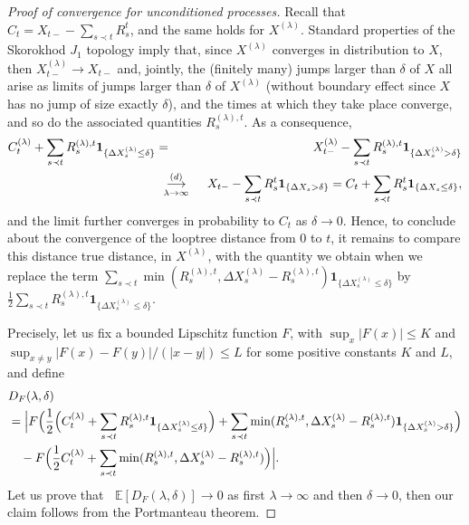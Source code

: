 \documentclass[british, a4paper,11pt]{article}
\numberwithin{equation}{section}
\theoremstyle{definition}
\newcommand{\E}{\mathop{}\!\mathbb{E}}
\newcommand{\ind}[1]{\mathbf{1}_{\{#1\}}}
\newcommand{\cvloi}[1][n]{\enskip\mathop{\longrightarrow}^{(d)}_{#1 \to \infty}\enskip}
\begin{document}
\begin{proof}[Proof of convergence for unconditioned processes]
Recall that $C_t = X_{t-} - \sum_{s \prec t} R^t_s$, and the same holds for $X^{(\lambda)}$.
Standard properties of the Skorokhod $J_{1}$ topology imply that, since $X^{(\lambda)}$ converges in distribution to $X$, then $X^{(\lambda)}_{t-} \to X_{t-}$ and, jointly, the (finitely many) jumps larger than $\delta$ of $X$ all arise as limits of jumps larger than $\delta$ of $X^{(\lambda)}$ (without boundary effect since $X$ has no jump of size exactly $\delta$), and the times at which they take place converge, and so do the associated quantities $R^{(\lambda), t}_s$.
As a consequence,
\begin{eqnarray*}
C^{(\lambda)}_t + \sum_{s \prec t} R^{(\lambda), t}_s \ind{\Delta X^{(\lambda)}_s\leq \delta}
&=& X^{(\lambda)}_{t-} - \sum_{s \prec t} R^{(\lambda), t}_s \ind{\Delta X^{(\lambda)}_s>\delta}\\
&\displaystyle\cvloi[\lambda]& X_{t-} - \sum_{s \prec t} R^t_s \ind{\Delta X_s>\delta}
= C_{t} + \sum_{s \prec t} R^t_s \ind{\Delta X_s\leq \delta}
,
\end{eqnarray*}
and the limit further converges in probability to $C_t$ as $\delta\to0$.
Hence, to conclude about the convergence of the looptree distance from $0$ to $t$, it remains to compare this distance true distance, in $X^{(\lambda)}$, with the quantity we obtain when we replace the term $\sum_{s \prec t} \min(R^{(\lambda), t}_s, \Delta X^{(\lambda)}_s-R^{(\lambda), t}_s) \ind{\Delta X^{(\lambda)}_s\leq \delta}$ by $\frac{1}{2} \sum_{s \prec t} R^{(\lambda), t}_s \ind{\Delta X^{(\lambda)}_s\leq \delta}$.


Precisely, let us fix a bounded Lipschitz function $F$, with
$\sup_x |F(x)| \le K$ and $\sup_{x \ne y} |F(x)-F(y)|/(|x-y|) \le L$ for some positive constants $K$ and $L$,
and define
\begin{align*}
&D_F(\lambda, \delta)
\\
&= \Bigl|F\Bigl(\frac{1}{2} \Bigl(C^{(\lambda)}_t + \sum_{s \prec t} R^{(\lambda), t}_s \ind{\Delta X^{(\lambda)}_s\leq \delta}\Bigr) + \sum_{s \prec t} \min(R^{(\lambda), t}_s, \Delta X^{(\lambda)}_s-R^{(\lambda), t}_s) \ind{\Delta X^{(\lambda)}_s > \delta}\Bigr)
\\
&\quad- F\Bigl(\frac{1}{2} C^{(\lambda)}_t + \sum_{s \prec t} \min(R^{(\lambda), t}_s, \Delta X^{(\lambda)}_s-R^{(\lambda), t}_s)\Bigr)\Bigr|.
\end{align*}
Let us prove that $\E[D_F(\lambda, \delta)] \to 0$ as first $\lambda \to \infty$ and then $\delta \to 0$, then our claim follows from the Portmanteau theorem.


\end{proof}
\end{document}
